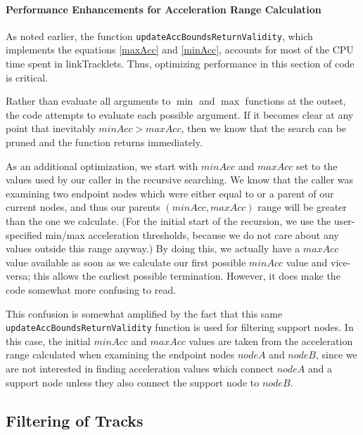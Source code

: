 \paragraph{Performance Enhancements for Acceleration Range Calculation}
As noted earlier, the function {\tt updateAccBoundsReturnValidity},
which implements the equations \ref{maxAcc} and \ref{minAcc},
accounts for most of the CPU time spent in linkTracklets.  Thus,
optimizing performance in this section of code is critical.

Rather than evaluate all arguments to $\min$ and $\max$ functions at
the outset, the code attempts to evaluate each possible argument. If
it becomes clear at any point that inevitably $minAcc > maxAcc$, then
we know that the search can be pruned and the function returns
immediately.

As an additional optimization, we start with $minAcc$ and $maxAcc$ set
to the values used by our caller in the recursive searching. We know
that the caller was examining two endpoint nodes which were either
equal to or a parent of our current nodes, and thus our parents
$(minAcc, maxAcc)$ range will be greater than the one we
calculate. (For the initial start of the recursion, we use the
user-specified min/max acceleration thresholds, because we do not care
about any values outside this range anyway.)  By doing this, we
actually have a $maxAcc$ value available as soon as we calculate our
first possible $minAcc$ value and vice-versa; this allows the earliest
possible termination.  However, it does make the code somewhat more
confusing to read.

This confusion is somewhat amplified by the fact that this same {\tt
  updateAccBoundsReturnValidity} function is used for filtering
support nodes.  In this case, the initial $minAcc$ and $maxAcc$ values
are taken from the acceleration range calculated when examining the
endpoint nodes $nodeA$ and $nodeB$, since we are not interested in
finding acceleration values which connect $nodeA$ and a support node
unless they also connect the support node to $nodeB$.








\subsection{Filtering of Tracks}
